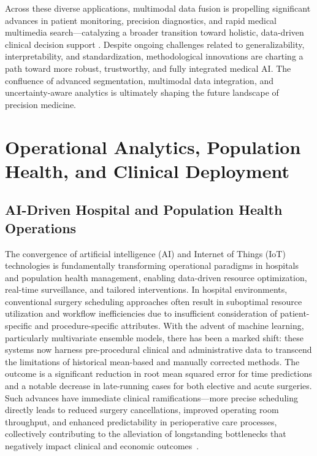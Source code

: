 Across these diverse applications, multimodal data fusion is propelling significant advances in patient monitoring, precision diagnostics, and rapid medical multimedia search—catalyzing a broader transition toward holistic, data-driven clinical decision support \cite{ref41,ref42,ref50,ref61,ref65,ref70,ref71,ref86,ref89,ref90,ref104,ref105}. Despite ongoing challenges related to generalizability, interpretability, and standardization, methodological innovations are charting a path toward more robust, trustworthy, and fully integrated medical AI. The confluence of advanced segmentation, multimodal data integration, and uncertainty-aware analytics is ultimately shaping the future landscape of precision medicine.

\section{Operational Analytics, Population Health, and Clinical Deployment}

\subsection{AI-Driven Hospital and Population Health Operations}

The convergence of artificial intelligence (AI) and Internet of Things (IoT) technologies is fundamentally transforming operational paradigms in hospitals and population health management, enabling data-driven resource optimization, real-time surveillance, and tailored interventions. In hospital environments, conventional surgery scheduling approaches often result in suboptimal resource utilization and workflow inefficiencies due to insufficient consideration of patient-specific and procedure-specific attributes. With the advent of machine learning, particularly multivariate ensemble models, there has been a marked shift: these systems now harness pre-procedural clinical and administrative data to transcend the limitations of historical mean-based and manually corrected methods. The outcome is a significant reduction in root mean squared error for time predictions and a notable decrease in late-running cases for both elective and acute surgeries. Such advances have immediate clinical ramifications—more precise scheduling directly leads to reduced surgery cancellations, improved operating room throughput, and enhanced predictability in perioperative care processes, collectively contributing to the alleviation of longstanding bottlenecks that negatively impact clinical and economic outcomes~\cite{ref81}.

